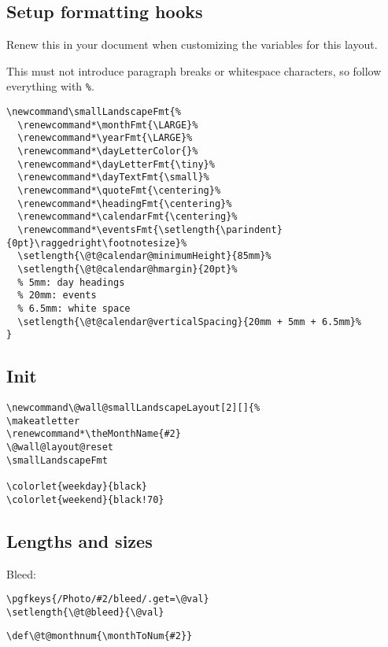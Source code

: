 \documentclass[11pt,oneside]{memoir-article}
\begin{document}
\subsection{Setup formatting hooks}
\label{sec:org4827364}

Renew this in your document when customizing the variables for this layout.

This must not introduce paragraph breaks or whitespace characters, so follow
everything with \texttt{\%}.

\begin{verbatim}
\newcommand\smallLandscapeFmt{%
  \renewcommand*\monthFmt{\LARGE}%
  \renewcommand*\yearFmt{\LARGE}%
  \renewcommand*\dayLetterColor{}%
  \renewcommand*\dayLetterFmt{\tiny}%
  \renewcommand*\dayTextFmt{\small}%
  \renewcommand*\quoteFmt{\centering}%
  \renewcommand*\headingFmt{\centering}%
  \renewcommand*\calendarFmt{\centering}%
  \renewcommand*\eventsFmt{\setlength{\parindent}{0pt}\raggedright\footnotesize}%
  \setlength{\@t@calendar@minimumHeight}{85mm}%
  \setlength{\@t@calendar@hmargin}{20pt}%
  % 5mm: day headings
  % 20mm: events
  % 6.5mm: white space
  \setlength{\@t@calendar@verticalSpacing}{20mm + 5mm + 6.5mm}%
}
\end{verbatim}

\subsection{Init}
\label{sec:orgea0808e}

\begin{verbatim}
\newcommand\@wall@smallLandscapeLayout[2][]{%
\makeatletter
\renewcommand*\theMonthName{#2}
\@wall@layout@reset
\smallLandscapeFmt

\colorlet{weekday}{black}
\colorlet{weekend}{black!70}
\end{verbatim}

\subsection{Lengths and sizes}
\label{sec:orgaa81909}

Bleed:

\begin{verbatim}
\pgfkeys{/Photo/#2/bleed/.get=\@val}
\setlength{\@t@bleed}{\@val}
\end{verbatim}

\begin{verbatim}
\def\@t@monthnum{\monthToNum{#2}}
\end{verbatim}
\end{document}
